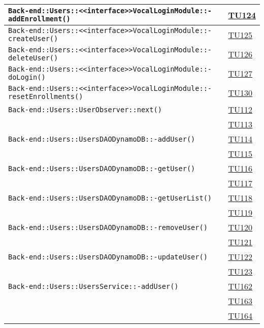 \begin{longtable}{|>{\centering}m{12cm}|m{1cm}<{\centering}|}
\texttt{Back-end::Users::<<interface>>VocalLoginModule::-\linebreak addEnrollment()} & \hyperlink{TU124}{TU124}\\ \hline
\texttt{Back-end::Users::<<interface>>VocalLoginModule::-\linebreak createUser()} & \hyperlink{TU125}{TU125}\\ \hline
\texttt{Back-end::Users::<<interface>>VocalLoginModule::-\linebreak deleteUser()} & \hyperlink{TU126}{TU126}\\ \hline
\texttt{Back-end::Users::<<interface>>VocalLoginModule::-\linebreak doLogin()} & \hyperlink{TU127}{TU127}\\ \hline
\texttt{Back-end::Users::<<interface>>VocalLoginModule::-\linebreak resetEnrollments()} & \hyperlink{TU130}{TU130}\\ \hline
\texttt{Back-end::Users::UserObserver::next()} & \hyperlink{TU112}{TU112}\\ & \hyperlink{TU113}{TU113}\\ \hline
\texttt{Back-end::Users::UsersDAODynamoDB::-\linebreak addUser()} & \hyperlink{TU114}{TU114}\\ & \hyperlink{TU115}{TU115}\\ \hline
\texttt{Back-end::Users::UsersDAODynamoDB::-\linebreak getUser()} & \hyperlink{TU116}{TU116}\\ & \hyperlink{TU117}{TU117}\\ \hline
\texttt{Back-end::Users::UsersDAODynamoDB::-\linebreak getUserList()} & \hyperlink{TU118}{TU118}\\ & \hyperlink{TU119}{TU119}\\ \hline
\texttt{Back-end::Users::UsersDAODynamoDB::-\linebreak removeUser()} & \hyperlink{TU120}{TU120}\\ & \hyperlink{TU121}{TU121}\\ \hline
\texttt{Back-end::Users::UsersDAODynamoDB::-\linebreak updateUser()} & \hyperlink{TU122}{TU122}\\ & \hyperlink{TU123}{TU123}\\ \hline
\texttt{Back-end::Users::UsersService::-\linebreak addUser()} & \hyperlink{TU162}{TU162}\\ & \hyperlink{TU163}{TU163}\\ & \hyperlink{TU164}{TU164}\\ \hline

\end{longtable}
